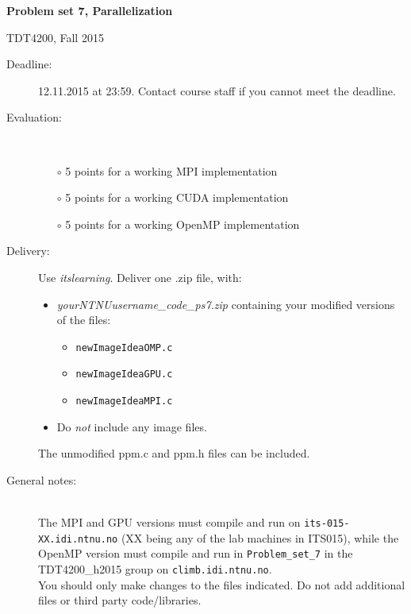 \documentclass[10pt,a4paper]{article}
\newcommand{\PROBSET}{7}
\begin{document}

{\noindent \LARGE \textbf{Problem set \PROBSET, Parallelization}}

{\noindent \large TDT4200, Fall 2015}

\begin{description}
	\item[Deadline:] 12.11.2015 at 23:59. Contact course staff if you cannot meet the deadline.
	\item[Evaluation:] ~
		\begin{itemize}
			\item[$\circ$] \vspace*{-1mm}5 points for a working MPI implementation
			\item[$\circ$] 5 points for a working CUDA implementation
			\item[$\circ$] 5 points for a working OpenMP implementation
		\end{itemize}
	\item[Delivery:] Use \textit{itslearning}. Deliver one .zip file, with:
		\begin{itemize}
			\item \emph{yourNTNUusername\_code\_ps{\PROBSET.zip}}
				containing your modified versions of the files:
				\begin{itemize}
					\item \texttt{newImageIdeaOMP.c}
					\item \texttt{newImageIdeaGPU.c}
					\item \texttt{newImageIdeaMPI.c}
				\end{itemize}
				\item Do \emph{not} include any image files.
				
		\end{itemize}
		The unmodified ppm.c and ppm.h files can be included.

	\item[General notes:] ~\\
		The MPI and GPU versions must compile and run on 
		\texttt{its-015-XX.idi.ntnu.no} (XX being any of the lab machines in
		ITS015), while the OpenMP version must compile and run in
		\texttt{Problem\_set\_\PROBSET} in the TDT4200\_h2015 group on
		\texttt{climb.idi.ntnu.no}.\\[2mm]
		You should only make changes to the files indicated.
		Do not add additional files or third party code/libraries.
\end{description}
\end{document}
